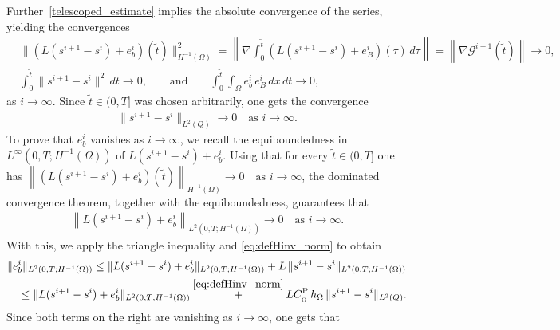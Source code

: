 \documentclass[review,11pt]{article}
\numberwithin{equation}{section}
\def \Om {\Omega}
\def \t  {\tau}
\begin{document}
Further~\eqref{telescoped_estimate} implies the absolute convergence of the series, yielding the  convergences
\begin{align}\label{eq:inq_new}
&\|\left(L(s^{i+1} - s^i) + e_b^i\right)({\tilde{t}})
\|^2_{H^{-1}(\Omega)} = \left\|\nabla \int_0^{\tilde{t}} (L(s^{i+1} - s^i) + e_B^i)(\t)\, d\t\right\|= \left\| \nabla \mathcal{G}^{i+1}({\tilde{t}})\right\|\to 0,
\nonumber\\
&\int_0^{\tilde{t}} \|s^{i+1}-s^{i}\|^2\,dt \to 0, \qquad\text{and}\qquad
\int_0^{\tilde{t}}\int_\Omega e_b^i\,e_B^i\,dx\,dt \to 0,
\end{align}
as $i\to\infty$. Since $\tilde{t} \in (0,T]$ was chosen arbitrarily, one gets the convergence
\begin{align}
\|s^{i+1} - s^i\|_{L^2(Q)} \to 0 \quad \text{as } i \to \infty.
\end{align}
To prove that $e_b^i$ vanishes as $i \to \infty$, we recall the equiboundedness in $L^{\infty}(0,T;H^{-1}(\Omega))$ of 
$L(s^{i+1}-s^i) + e_b^i$. Using that for every $\tilde{t}\in (0,T]$ one has $\left\|\left(L(s^{i+1}-s^i) + e_b^i\right)(\tilde{t})\right\|_{H^{-1}(\Omega)} \to 0 \quad \text{as } i \to \infty$, the dominated convergence theorem, together with the equiboundedness, guarantees that 
\begin{align}
\left\|L(s^{i+1}-s^i) + e_b^i\right\|_{L^2(0,T;H^{-1}(\Omega))} 
\to 0 \quad \text{as } i \to \infty.
\end{align}
With this, we apply the triangle inequality and \eqref{eq:defHinv_norm} to obtain
\begin{align}
&\|e_b^i\|_{L^2(0,T;H^{-1}(\Omega))}
\le 
\|L(s^{i+1}-s^i)+e_b^i\|_{L^2(0,T;H^{-1}(\Omega))}
+L\,\|s^{i+1}-s^i\|_{L^2(0,T;H^{-1}(\Omega))} \nonumber\\
&\quad \leq \|L(s^{i+1} - s^i) + e_b^i\|_{L^2(0,T;H^{-1}(\Omega))} 
\overset{\eqref{eq:defHinv_norm}}{+}
LC_{\,\!_{\Omega}}^{\mathrm{P}} \, h_\Omega\,
\|s^{i+1}-s^i\|_{L^2(Q)}.\label{eq:b_convergence}
\end{align}
Since both terms on the right are vanishing  as $i \to \infty$, one gets that%
\end{document}
